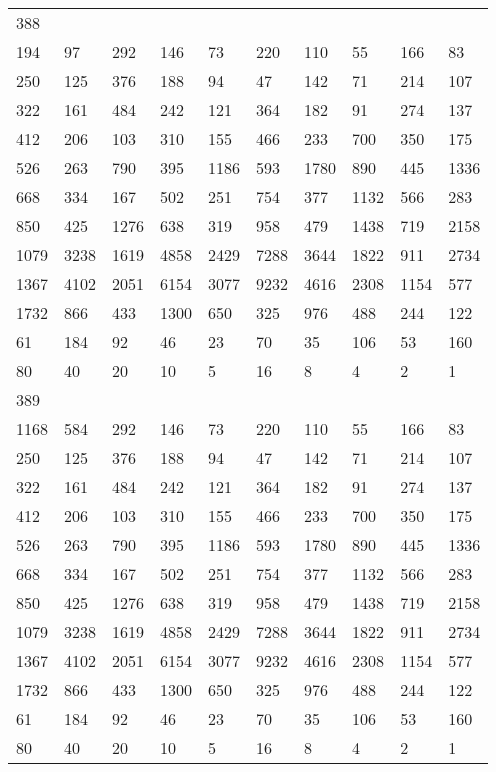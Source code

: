 \begin{longtable}{*{10}{l}}
388&&&&&&&&&\\
194& 97& 292& 146& 73& 220& 110& 55& 166& 83\\
250& 125& 376& 188& 94& 47& 142& 71& 214& 107\\
322& 161& 484& 242& 121& 364& 182& 91& 274& 137\\
412& 206& 103& 310& 155& 466& 233& 700& 350& 175\\
526& 263& 790& 395& 1186& 593& 1780& 890& 445& 1336\\
668& 334& 167& 502& 251& 754& 377& 1132& 566& 283\\
850& 425& 1276& 638& 319& 958& 479& 1438& 719& 2158\\
1079& 3238& 1619& 4858& 2429& 7288& 3644& 1822& 911& 2734\\
1367& 4102& 2051& 6154& 3077& 9232& 4616& 2308& 1154& 577\\
1732& 866& 433& 1300& 650& 325& 976& 488& 244& 122\\
61& 184& 92& 46& 23& 70& 35& 106& 53& 160\\
80& 40& 20& 10& 5& 16& 8& 4& 2& 1\\

389&&&&&&&&&\\
1168& 584& 292& 146& 73& 220& 110& 55& 166& 83\\
250& 125& 376& 188& 94& 47& 142& 71& 214& 107\\
322& 161& 484& 242& 121& 364& 182& 91& 274& 137\\
412& 206& 103& 310& 155& 466& 233& 700& 350& 175\\
526& 263& 790& 395& 1186& 593& 1780& 890& 445& 1336\\
668& 334& 167& 502& 251& 754& 377& 1132& 566& 283\\
850& 425& 1276& 638& 319& 958& 479& 1438& 719& 2158\\
1079& 3238& 1619& 4858& 2429& 7288& 3644& 1822& 911& 2734\\
1367& 4102& 2051& 6154& 3077& 9232& 4616& 2308& 1154& 577\\
1732& 866& 433& 1300& 650& 325& 976& 488& 244& 122\\
61& 184& 92& 46& 23& 70& 35& 106& 53& 160\\
80& 40& 20& 10& 5& 16& 8& 4& 2& 1\\


\end{longtable}
